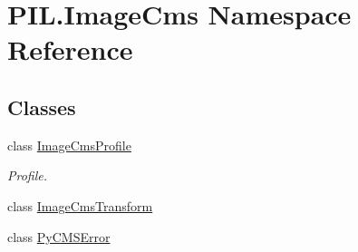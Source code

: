 \hypertarget{namespacePIL_1_1ImageCms}{}\section{P\+I\+L.\+Image\+Cms Namespace Reference}
\label{namespacePIL_1_1ImageCms}
\subsection*{Classes}
\begin{DoxyCompactItemize}
\item 
class \hyperlink{classPIL_1_1ImageCms_1_1ImageCmsProfile}{Image\+Cms\+Profile}
\begin{DoxyCompactList}\small\item\em Profile. \end{DoxyCompactList}\item 
class \hyperlink{classPIL_1_1ImageCms_1_1ImageCmsTransform}{Image\+Cms\+Transform}
\item 
class \hyperlink{classPIL_1_1ImageCms_1_1PyCMSError}{Py\+C\+M\+S\+Error}
\end{DoxyCompactItemize}
